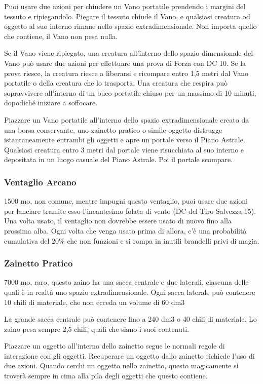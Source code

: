 \begin{multicols}{2}
Puoi usare due azioni per chiudere un Vano portatile prendendo i margini del tessuto e ripiegandolo. Piegare il tessuto chiude il Vano, e qualsiasi creatura od oggetto al suo interno rimane nello spazio extradimensionale. Non importa quello che contiene, il Vano non pesa nulla.

Se il Vano viene ripiegato, una creatura all'interno dello spazio dimensionale del Vano può usare due azioni per effettuare una prova di Forza con DC 10. Se la prova riesce, la creatura riesce a liberarsi e ricompare entro 1,5 metri dal Vano portatile o della creatura che lo trasporta. Una creatura che respira può sopravvivere all'interno di un buco portatile chiuso per un massimo di 10 minuti, dopodiché iniziare a soffocare.

Piazzare un Vano portatile all'interno dello spazio extradimensionale creato da una borsa conservante, uno zainetto pratico o simile oggetto distrugge istantaneamente entrambi gli oggetti e apre un portale verso il Piano Astrale. Qualsiasi creatura entro 3 metri dal portale viene risucchiata al suo interno e depositata in un luogo casuale del Piano Astrale. Poi il portale scompare.

\subsubsection*{Ventaglio Arcano}
1500 mo, non comune, mentre impugni questo ventaglio, puoi usare due azioni per lanciare tramite esso l'incantesimo folata di vento (DC del Tiro Salvezza 15). Una volta usato, il ventaglio
non dovrebbe essere usato di nuovo fino alla prossima alba. Ogni volta che venga usato prima di allora, c'è una probabilità cumulativa del 20\% che non funzioni e si rompa in inutili brandelli privi di magia.


\subsubsection*{Zainetto Pratico}
7000 mo, raro, questo zaino ha una sacca centrale e due laterali, ciascuna delle quali è in realtà uno spazio extradimensionale. Ogni sacca laterale può contenere 10 chili di materiale, che non ecceda un volume di 60 dm3

La grande sacca centrale può contenere fino a 240 dm3 o 40 chili di materiale. Lo zaino pesa sempre 2,5 chili, quali che siano i suoi contenuti.

Piazzare un oggetto all'interno dello zainetto segue le normali regole di interazione con gli oggetti. Recuperare un oggetto dallo zainetto richiede l'uso di due azioni. Quando cerchi un oggetto nello zainetto, questo magicamente si troverà sempre in cima alla pila degli oggetti che questo contiene.


\end{multicols}
